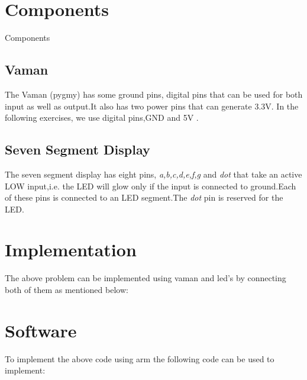 \documentclass[10pt,a4paper]{article}
\begin{document}
\section{Components}
\begin{table}[h]
\centering

\caption{Components}
\label{table:components}
\end{table}
\subsection{Vaman} 
The Vaman (pygmy) has some ground pins, digital pins that can be used for both input as well as output.It also has two power pins that can generate 3.3V. In the following exercises, we use digital pins,GND and 5V .
\subsection{Seven Segment Display}
The seven segment display has eight pins, \emph{a,b,c,d,e,f,g} and \emph{dot} that take an active LOW input,i.e. the LED will glow only if the input is connected to ground.Each of these pins is connected to an LED segment.The \emph{dot} pin is reserved for the LED.
\section{Implementation}
The above problem can be implemented using vaman and led's by connecting both of them as mentioned below:

\section{Software}
To implement the above code using arm the following code can be used to implement:

\end{document}
